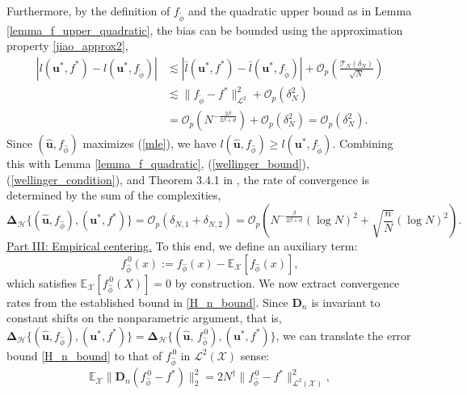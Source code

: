 \documentclass[
  12pt]{article}
\begin{document}
\noindent Furthermore, by the definition of $f_{\widetilde{\phi}}$ and the quadratic upper bound as in Lemma \ref{lemma_f_upper_quadratic}, the bias can be bounded using the approximation property \eqref{jiao_approx2},
$$\begin{aligned}
     \left|l(\boldsymbol{u}^*,f^*)-l(\boldsymbol{u}^*,f_{\widetilde{\phi}})\right|&\lesssim \left|\bar{l}(\boldsymbol{u}^*,f^*)-\bar{l}(\boldsymbol{u}^*,f_{\widetilde{\phi}})\right| + \mathcal{O}_p\left(\frac{\mathcal{T}_{N}(\delta_N)}{\sqrt{N}}\right)\\
     &\lesssim  \| f_{\widetilde{\phi}}-f^* \|^2_{\mathcal{L}^2} + \mathcal{O}_p(\delta_N^2)\\
     &= \mathcal{O}_p( N^{-\frac{2 \beta}{2\beta +d}}) +  \mathcal{O}_p(\delta_N^2) = \mathcal{O}_p(\delta_N^2).
\end{aligned}$$
\noindent Since $(\widehat{\boldsymbol{u}},f_{\widehat{\phi}})$ maximizes (\ref{mle}), we have $l(\widehat{\boldsymbol{u}},f_{\widehat{\phi}})\geq l(\boldsymbol{u}^*,f_{\widetilde{\phi}})$. Combining this with Lemma \ref{lemma_f_quadratic}, (\ref{wellinger_bound}), (\ref{wellinger_condition}), and Theorem 3.4.1 in \cite{van1996weak}, the rate of convergence is determined by the sum of the complexities,
\begin{equation}\label{H_n_bound}
     \mathbf{\Delta}_{\mathcal{H}}\{(\widehat{\boldsymbol{u}},f_{\widehat{\phi}}), (\boldsymbol{u}^*,f^*)\}=\mathcal{O}_p(\delta_{N,1}+\delta_{N,2}) = \mathcal{O}_p\left(N^{-\frac{\beta}{2\beta +d}} (\log N)^2 + \sqrt{\frac{n}{N}} (\log N)^2\right).
\end{equation} 
\underline{Part III: Empirical centering.} To this end, we define an auxiliary term:
$$f_{\widehat{\phi}}^{\,0}(x):=f_{\widehat{\phi}}(x)- \mathbb{E}_{\mathcal{X}}[f_{\widehat{\phi}}(x)],$$
which satisfies $\mathbb{E}_{\mathcal{X}}[f_{\widehat{\phi}}^{\,0}(X)]=0$ by construction. We now extract convergence rates from the established bound in \eqref{H_n_bound}. Since $\boldsymbol{D}_n$ is invariant to constant shifts on the nonparametric argument, that is, $\mathbf{\Delta}_{\mathcal{H}}\{(\widehat{\boldsymbol{u}},f_{\widehat{\phi}}),(\boldsymbol{u}^*,f^*)\}=\mathbf{\Delta}_{\mathcal{H}}\{(\widehat{\boldsymbol{u}},\,f_{\widehat{\phi}}^{\,0}),(\boldsymbol{u}^*,f^*)\}$, we can translate the error bound \eqref{H_n_bound} to that of $f_{\widehat{\phi}}^{\,0}$ in $\mathcal{L}^2(\mathcal{X})$ sense:
$$\mathbb{E}_{\mathcal{X}}\|\boldsymbol{D}_n(f_{\widehat{\phi}}^{\,0}-f^*)\|_2^2= 2N^\dagger\|f_{\widehat{\phi}}^{\,0}-f^*\|_{\mathcal{L}^2(\mathcal{X})}^2,$$
\end{document}
